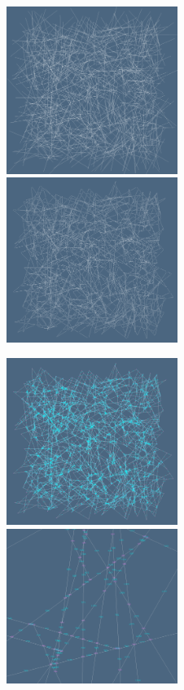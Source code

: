 \documentclass[11pt, oneside]{article}   	%
\begin{document}
\begin{figure}[htbp] %
   \centering
   \includegraphics[height=0.495\textwidth,width=0.495\textwidth]{2Dcells-1} 
   \includegraphics[height=0.495\textwidth,width=0.495\textwidth]{2Dcells-2} 
   
   \includegraphics[height=0.495\textwidth,width=0.495\textwidth]{2Dcells-3} 
   \includegraphics[height=0.495\textwidth,width=0.495\textwidth]{2Dcells-4} 


\end{figure}
\end{document}
